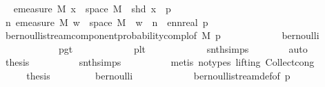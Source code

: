 \begin{isabellebody}
\ \isamarkupfalse%
\ {\isachardoublequoteopen}emeasure\ M\ {\isacharbraceleft}{\kern0pt}x\ {\isasymin}\ space\ M{\isachardot}{\kern0pt}\ {\isasymnot}\ shd\ x{\isacharbraceright}{\kern0pt}\ {\isacharequal}{\kern0pt}\ {}{\isacharminus}{\kern0pt}p{\isachardoublequoteclose}\isanewline
\ \ \ \ \isamarkupfalse%
{\isacharminus}{\kern0pt}\isanewline
\ \ \ \ \ \ \isamarkupfalse%
\ {\isachardoublequoteopen}{\isasymforall}n{\isachardot}{\kern0pt}\ emeasure\ M\ {\isacharbraceleft}{\kern0pt}w\ {\isasymin}\ space\ M{\isachardot}{\kern0pt}\ {\isasymnot}\ w\ {\isacharbang}{\kern0pt}{\isacharbang}{\kern0pt}\ n{\isacharbraceright}{\kern0pt}\ {\isacharequal}{\kern0pt}\ ennreal\ {\isacharparenleft}{\kern0pt}{}{\isacharminus}{\kern0pt}p{\isacharparenright}{\kern0pt}{\isachardoublequoteclose}\isanewline
\ \ \ \ \ \ \ \ \isamarkupfalse%
\ bernoulli{\isacharunderscore}{\kern0pt}stream{\isacharunderscore}{\kern0pt}component{\isacharunderscore}{\kern0pt}probability{\isacharunderscore}{\kern0pt}compl{\isacharbrackleft}{\kern0pt}of\ M\ p{\isacharbrackright}{\kern0pt}\isanewline
\ \ \ \ \ \ \ \ \ \ \ \ bernoulli\isanewline
\ \ \ \ \ \ \ \ \ \ \ \ p{\isacharunderscore}{\kern0pt}gt{\isacharunderscore}{\kern0pt}{}\isanewline
\ \ \ \ \ \ \ \ \ \ \ \ p{\isacharunderscore}{\kern0pt}lt{\isacharunderscore}{\kern0pt}{}\isanewline
\ \ \ \ \ \ \ \ \ \ \ \ snth{\isachardot}{\kern0pt}simps{\isacharparenleft}{\kern0pt}{}{\isacharparenright}{\kern0pt}\isanewline
\ \ \ \ \ \ \isamarkupfalse%
\ auto\isanewline
\ \ \ \ \ \ \isamarkupfalse%
\ \isamarkupfalse%
\ {\isacharquery}{\kern0pt}thesis\isanewline
\ \ \ \ \ \ \ \ \isamarkupfalse%
\ snth{\isachardot}{\kern0pt}simps{\isacharparenleft}{\kern0pt}{}{\isacharparenright}{\kern0pt}\isanewline
\ \ \ \ \ \ \ \ \isamarkupfalse%
\ {\isacharparenleft}{\kern0pt}metis\ {\isacharparenleft}{\kern0pt}no{\isacharunderscore}{\kern0pt}types{\isacharcomma}{\kern0pt}\ lifting{\isacharparenright}{\kern0pt}\ Collect{\isacharunderscore}{\kern0pt}cong{\isacharparenright}{\kern0pt}\isanewline
\ \ \ \ \isamarkupfalse%
\isanewline
\ \ \isamarkupfalse%
\ \isamarkupfalse%
\ {\isacharquery}{\kern0pt}thesis\isanewline
\ \ \ \ \ \ \isamarkupfalse%
\ \ bernoulli\isanewline
\ \ \ \ \ \ \ \ \ \ \ \ bernoulli{\isacharunderscore}{\kern0pt}stream{\isacharunderscore}{\kern0pt}def{\isacharbrackleft}{\kern0pt}of\ p{\isacharbrackright}{\kern0pt}\isanewline

\end{isabellebody}
